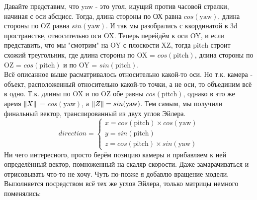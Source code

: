\documentclass[12pt]{article}
\newcounter{subsubsubsection}[subsubsection]
\begin{document}
  \noindent
  Давайте представим, что yaw - это угол, идущий против часовой стрелки, начиная с оси абсцисс.
  Тогда, длина стороны по ОХ равна $cos(\text{yaw})$, длина стороны по OZ равна $sin(\text{yaw})$.
  И так мы разобрались с ккординатой в 3d пространстве, относительно оси OX.
  Теперь перейдём к оси OY, и если представить, что мы "смотрим" на OY 
  с плоскости XZ, тогда pitch строит схожий треугольник, где 
  длина стороны по OX = $cos(\text{pitch})$, длина стороны по OZ = $cos(\text{pitch})$ и
  по OY = $sin(\text{pitch})$.
  \\[0.5cm]
  \noindent
  Всё описанное выше расматривалось относительно какой-то оси.
  Но т.к. камера - объект, расположенный относительно какой-то
  точки, а не оси, то объединим всё в одно. Т.к. длины по OX и по
  OZ обе равны $cos(\text{pitch})$, однако в это же аремя $\norm{X}$ = $cos(\text{yaw})$,
  а $\norm{Z} = sin(\text{yaw})$. Тем самым, мы получили финальный вектор, транслированный
  из двух углов Эйлера.
  $$
  direction = \begin{cases} x = cos(\text{pitch}) \times cos(\text{yaw})\\ y = sin(\text{pitch}) \\  z = cos(\text{pitch}) \times sin(\text{yaw}) \end{cases}
  $$ 
  Ни чего интересного, просто берём позицию камеры и прибавляем к ней определённый
  вектор, помноженный на скаляр скорости. Даже замарачиваться и отрисовывать что-то не хочу.
  Чуть по-позже я добавлю вращение модели.
  Выполняется посредством всё тех же углов Эйлера, только матрицы немного поменялись:
\end{document}
